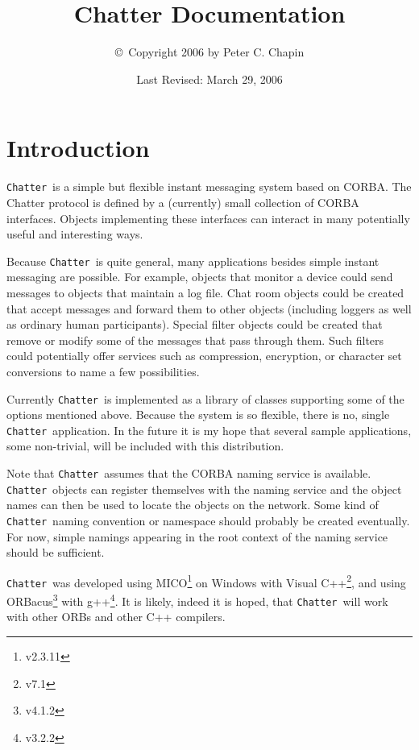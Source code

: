 \documentclass{article}
\newcommand{\Chatter}{\texttt{Chatter}}
\begin{document}
\title{Chatter Documentation}
\author{\copyright\ Copyright 2006 by Peter C. Chapin}
\date{Last Revised: March 29, 2006}
\maketitle

\section*{Introduction}

\Chatter\ is a simple but flexible instant messaging system based on CORBA. The Chatter protocol is defined by a (currently) small collection of CORBA interfaces. Objects implementing these interfaces can interact in many potentially useful and interesting ways.

Because \Chatter\ is quite general, many applications besides simple instant messaging are possible. For example, objects that monitor a device could send messages to objects that maintain a log file. Chat room objects could be created that accept messages and forward them to other objects (including loggers as well as ordinary human participants). Special filter objects could be created that remove or modify some of the messages that pass through them. Such filters could potentially offer services such as compression, encryption, or character set conversions to name a few possibilities.

Currently \Chatter\ is implemented as a library of classes supporting some of the options mentioned above. Because the system is so flexible, there is no, single \Chatter\ application. In the future it is my hope that several sample applications, some non-trivial, will be included with this distribution.

Note that \Chatter\ assumes that the CORBA naming service is available. \Chatter\ objects can register themselves with the naming service and the object names can then be used to locate the objects on the network. Some kind of \Chatter\ naming convention or namespace should probably be created eventually. For now, simple namings appearing in the root context of the naming service should be sufficient.

\Chatter\ was developed using MICO\footnote{v2.3.11} on Windows with Visual C++\footnote{v7.1}, and using ORBacus\footnote{v4.1.2} with g++\footnote{v3.2.2}. It is likely, indeed it is hoped, that \Chatter\ will work with other ORBs and other C++ compilers.
\end{document}
